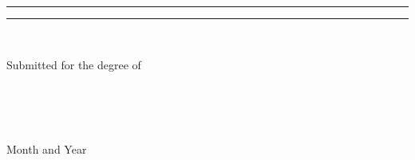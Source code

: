\begin{titlepage}

\begin{center}
\rule{\linewidth}{1pt}

\textsc{\Large\thesistitle}

\rule{\linewidth}{1pt}

\vfill

\begin{Large}\textbf{\name}\end{Large} \\
[3ex]\begin{large}Submitted for the degree of \degree\end{large}

\vfill
\begin{Large}\researchgroup\end{Large} \\
[2ex]\begin{Large}\department\end{Large} \\
[2ex]{\LARGE\university}\\
[10ex]

{Month and Year}

\end{center}

\end{titlepage}

%
%

